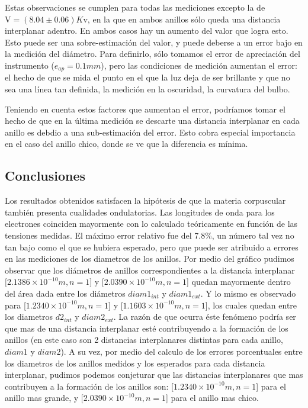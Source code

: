 \documentclass[]{article}
\begin{document}
Estas observaciones se cumplen para todas las mediciones excepto la de
\(\mathrm{V} = (8.04 \pm 0.06)K\mathrm{v}\), en la que en ambos anillos
sólo queda una distancia interplanar adentro. En ambos casos hay un
aumento del valor que logra esto. Esto puede ser una sobre-estimación
del valor, y puede deberse a un error bajo en la medición del diámetro.
Para definirlo, sólo tomamos el error de apreciación del instrumento
(\(e_{ap} = 0.1mm\)), pero las condiciones de medición aumentan el
error: el hecho de que se mida el punto en el que la luz deja de ser
brillante y que no sea una línea tan definida, la medición en la
oscuridad, la curvatura del bulbo.

Teniendo en cuenta estos factores que aumentan el error, podríamos tomar
el hecho de que en la última medición se descarte una distancia
interplanar en cada anillo es debdio a una sub-estimación del error.
Esto cobra especial importancia en el caso del anillo chico, donde se ve
que la diferencia es mínima.



\hypertarget{conclusiones}{%
\subsection{Conclusiones}\label{conclusiones}}

Los resultados obtenidos satisfacen la hipótesis de que la materia
corpuscular también presenta cualidades ondulatorias. Las longitudes de
onda para los electrones coinciden mayormente con lo calculado teóricamente en
función de las tensiones medidas. El máximo error relativo fue del
7.8\%, un número tal vez no tan bajo como el que se hubiera esperado, pero 
que puede ser atribuido a errores en las mediciones de los diametros de los
anillos. Por medio del gráfico pudimos observar que los diámetros de anillos correspondientes a la distancia interplanar $[2.1386 \times 10^{-10} m, n=1$] y [$2.0390 \times10^{-10} m, n=1$] quedan mayormente dentro del área dada 
entre los diámetros $diam1_{int}$ y $diam1_{ext}$. Y lo mismo es observado para [$1.2340 \times10^{-10} m, n=1$] y [$1.1603 \times10^{-10} m, n=1$], los 
cuales quedan entre los diametros $d2_{int}$ y $diam2_{ext}$. 
La razón de que ocurra éste fenómeno podría ser que mas de una distancia 
interplanar esté contribuyendo a la formación de los anillos (en este caso 
son 2 distancias interplanares distintas para cada anillo, $diam1$ y $diam2$).
A su vez, por medio del calculo de los errores porcentuales entre los diametros
de los anillos medidos y los esperados para cada distancia interplanar, pudimos
podemos conjeturar que las distancias interplanares que mas contribuyen a la
formación de los anillos son: [$1.2340 \times10^{-10} m, n=1$] para el anillo 
mas grande, y [$2.0390 \times10^{-10} m, n=1$] para el anillo mas chico.
\end{document}
